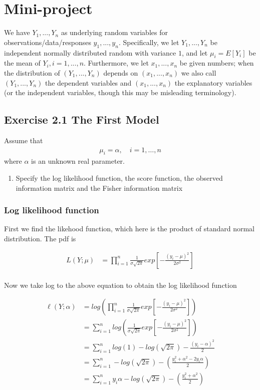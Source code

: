 \newpage
\section*{Mini-project}
We have $Y_1,...,Y_n$ as underlying random variables for observations/data/responses $y_1,...,y_n$.
Specifically, we let $Y_1,...,Y_n$ be independent normally distributed random with variance $1$, and let $\mu_i= E[Y_i]$ be the mean of $Y_i, i= 1,...,n$.
Furthermore, we let $x_1,...,x_n$ be given numbers; when the distribution of $(Y_1,...,Y_n)$ depends on $(x_1,...,x_n)$ we also call $(Y_1,...,Y_n)$ the dependent variables and $(x_1,...,x_n)$ the explanatory variables (or the independent variables, though this may be misleading terminology).

\subsection*{Exercise 2.1 The First Model}

Assume that
\begin{align*}
    \mu_i = \alpha, \quad i = 1, \ldots,n
\end{align*}
where $\alpha$ is an unknown real parameter. 

\begin{enumerate}
    \item Specify the log likelihood function, the score function, the observed information matrix and the Fisher information matrix
\end{enumerate}

\subsubsection{Log likelihood function}
First we find the likehood function, which here is the product of standard normal distribution. The pdf is 

\begin{align*}
   L(Y;\mu) &= \prod_{i=1}^n \frac{1}{\sigma \sqrt{2 \pi}}exp\left[-\frac{(y_i -\mu)^2}{2 \sigma^2}\right]\\
\end{align*}

Now we take log to the above equation to obtain the log likelihood function

\begin{align*}
   \ell(Y;\alpha) &= log \left( \prod_{i=1}^n \frac{1}{\sigma \sqrt{2 \pi}}exp\left[-\frac{(y_i -\mu)^2}{2 \sigma^2}\right] \right)\\
   &= \sum_{i = 1}^n log\left( \frac{1}{\sigma \sqrt{2 \pi}}exp\left[-\frac{(y_i - \mu)^2}{2 \sigma^2}\right] \right)\\
   &= \sum_{i = 1}^n log(1) - log(\sqrt{2 \pi}) - \frac{(y_i - \alpha)^2}{2}\\
   &= \sum_{i = 1}^n - log\left( \sqrt{2 \pi}\right) - \left(\frac{y_i^2 + \alpha^2 - 2y_i\alpha}{2}\right)\\
   &= \sum_{i = 1}^n y_i \alpha - log\left( \sqrt{2 \pi}\right) - \left( \frac{y_i^2 + \alpha^2}{2} \right)
\end{align*}

